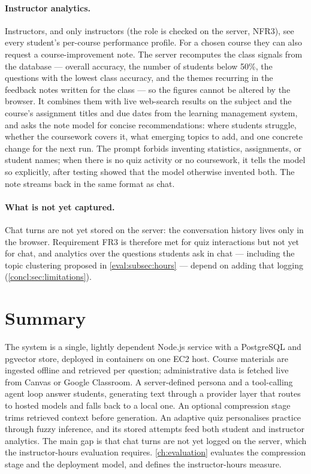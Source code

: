 \paragraph{Instructor analytics.} Instructors, and only instructors (the role
is checked on the server, NFR3), see every student's per-course performance
profile. For a chosen course they can also request a course-improvement
note. The server recomputes the class signals from the database --- overall
accuracy, the number of students below 50\%, the questions with the lowest
class accuracy, and the themes recurring in the feedback notes written for
the class --- so the figures cannot be altered by the browser. It combines
them with live web-search results on the subject and the course's
assignment titles and due dates from the learning management system, and asks the note model for concise recommendations:
where students struggle, whether the coursework covers it, what emerging
topics to add, and one concrete change for the next run. The prompt forbids
inventing statistics, assignments, or student names; when there is no quiz
activity or no coursework, it tells the model so explicitly, after testing
showed that the model otherwise invented both. The note streams back in the
same format as chat.

\paragraph{What is not yet captured.} Chat turns are not yet stored on the
server: the conversation history lives only in the browser. Requirement FR3
is therefore met for quiz interactions but not yet for chat, and analytics
over the questions students ask in chat --- including the topic clustering
proposed in \autoref{eval:subsec:hours} --- depend on adding that logging
(\autoref{concl:sec:limitations}).

\section{Summary}
\label{impl:sec:summary}

The system is a single, lightly dependent Node.js service with a
PostgreSQL and pgvector store, deployed in containers on one EC2 host. Course
materials are ingested offline and retrieved per question; administrative
data is fetched live from Canvas or Google Classroom. A server-defined
persona and a tool-calling agent loop answer students, generating text
through a provider layer that routes to hosted models and falls back to a
local one. An optional compression stage trims retrieved context before
generation. An adaptive quiz personalises practice through fuzzy inference,
and its stored attempts feed both student and instructor analytics. The main
gap is that chat turns are not yet logged on the server, which the
instructor-hours evaluation requires. \autoref{ch:evaluation} evaluates the
compression stage and the deployment model, and defines the instructor-hours
measure.
